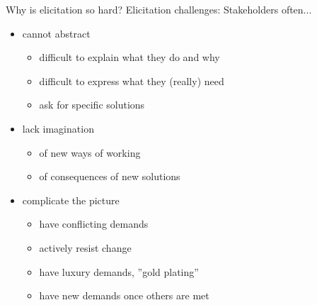 \begin{Slide}{Why is elicitation so hard?}
Elicitation challenges: Stakeholders often...
\begin{itemize}
\item cannot abstract 
\begin{itemize}
\item difficult to explain what they do and why
\item difficult to express what they (really) need
\item ask for specific solutions
\end{itemize}
\item lack imagination 
\begin{itemize}
\item of new ways of working
\item of consequences of new solutions
\end{itemize}
\item complicate the picture
\begin{itemize}
\item have conflicting demands
\item actively resist change
\item have luxury demands, ''gold plating''
\item have new demands once others are met

\end{itemize}
\end{itemize}
\end{Slide}